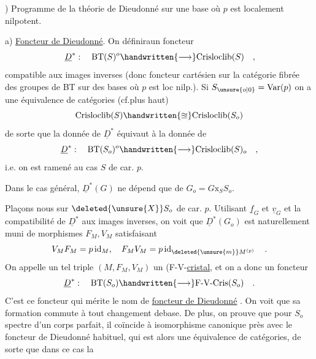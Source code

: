 ) Programme de la théorie de Dieudonné sur une base  où $p$ est localement nilpotent.

a) \uline{Foncteur de Dieudonné}. On  définiraun foncteur
\[
\underline{D}^{*}:\quad \mathrm{BT}(S)^o\handwritten{\longrightarrow}\mathrm{Crisloclib}(S)\quad,
\]
compatible aux images inverses (donc foncteur cartésien sur la catégorie fibrée des groupes de BT sur des bases où $p$ est loc\deleted{\unsure{,|;}} nilp.). Si $S_{\unsure{o|0}}=\mathrm{Var}(p)$ on a une équivalence de catégories (cf.\qquad plus haut)
\[
\mathrm{Crisloclib}(S)\handwritten{\approxeq}\mathrm{Crisloclib}(S_o)
\]
de sorte que la donnée de $\underline{D}^{*}$ équivaut à la donnée de
\[
\underline{D}^{*}:\quad\mathrm{BT}(S_o)^o\handwritten{\longrightarrow}\mathrm{Crisloclib}(S)_o\quad,
\]
i.e. on est ramené  au cas $S$ de car. $p$. 

Dans le cas général, $\underline{D}^{*}(G)$ ne dépend que de  $G_o=G\mathbin{\mathrm{x}}_S S_o$.

 Plaçons nous sur $\deleted{\unsure{X}}S_o$ de car. $p$. Utilisant $\underline{f}_G$ et $\underline{v}_G$ et la compatibilité de $\underline{D}^{*}$ aux images inverses, on voit que  $\underline{D}^{*}(G_o)$  est naturellement muni de morphismes $F_M,V_M$ 
satisfaisant
\[
V_M F_M=p\operatorname{id}_M,\quad F_M V_M=p\operatorname{id}_{\deleted{\unsure{m}}M^{(p)}}\quad.
\]
On appelle un tel triple $(M,F_M,V_M)$ un (F-V-\uline{cristal}, et on a donc un foncteur
\[
\underline{D}^{*}:\quad\mathrm{BT}(S_o)\handwritten{\longrightarrow}\text{F-V-Cris}(S_o)\quad .
\]
C'est ce foncteur qui mérite le nom de \uline{foncteur de Dieudonné} . On  voit que sa formation commute à tout changement de\handwritten{\inserted{ }}base. De plus, on prouve que pour $S_o$ spectre d'un corps parfait, il coïncide  à isomorphisme canonique près avec le foncteur de Dieudonné habituel, qui est alors une équivalence de catégories, de sorte que dans ce cas la

